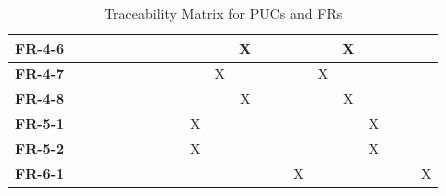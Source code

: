 \documentclass[12pt]{article}
\begin{document}
\begin{table}[H]
{\begin{tabular}{c|c|c|c|c|c|c|c|c|c|c|c|c|c|c|c|c|c|c|c|c|}
  \multicolumn{1}{|l|}{\textbf{FR-4-6}}  &              &              &              &              &              &              &              &              &              &              &       X      &              &              &              &              &       X      &              &              &              &              \\ \hline
  \multicolumn{1}{|l|}{\textbf{FR-4-7}}  &              &              &              &              &              &              &              &              &              &       X      &              &              &              &              &       X      &              &              &              &              &              \\ \hline
  \multicolumn{1}{|l|}{\textbf{FR-4-8}}  &              &              &              &              &              &              &              &              &              &              &       X      &              &              &              &              &       X      &              &              &              &              \\ \hline
  \multicolumn{1}{|l|}{\textbf{FR-5-1}}  &              &              &              &              &              &              &              &              &       X      &              &              &              &              &              &              &              &       X      &              &              &              \\ \hline
  \multicolumn{1}{|l|}{\textbf{FR-5-2}}  &              &              &              &              &              &              &              &              &       X      &              &              &              &              &              &              &              &       X      &              &              &              \\ \hline
  \multicolumn{1}{|l|}{\textbf{FR-6-1}}  &              &              &              &              &              &              &              &              &              &              &              &              &              &       X      &              &              &              &              &              &       X      \\ \hline
  \end{tabular}
  }
\caption{Traceability Matrix for PUCs and FRs}
    \label{tab:matrix-puc-fr}
\end{table}
\end{document}
